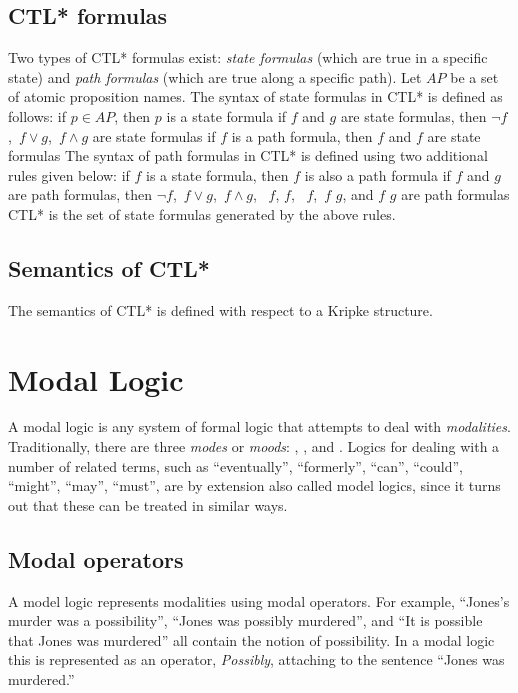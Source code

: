 \subsection{CTL* formulas}
Two types of CTL* formulas exist: {\em state formulas\/} (which are true in a
specific state) and {\em path formulas} (which are true along a specific
path). Let $AP$ be a set of atomic proposition names.
The syntax of state formulas in CTL* is defined as follows:
      \bit
      \w if $p \in AP$, then $p$ is a state formula
      \w if $f$ and $g$ are state formulas, then $\neg f$,\  $f \vee g$,\ $f
      \wedge g$ are state formulas
      \w if $f$ is a path formula, then  $f$ and  $f$ are state
      formulas 
      \eit
The syntax of path formulas in CTL* is defined using two additional rules
given below: 
      \bit
      \w if $f$ is a state formula, then $f$ is also a path formula
      \w if $f$ and $g$ are path formulas, then $\neg f$,\ $f \vee g$,\ 
      $f \wedge g$,\  $f$,  $f$,\  $f$,\ $f$  $g$,
      and $f$ \bb{R} $g$ are path formulas
      \eit
CTL* is the set of state formulas generated by the above rules.


\subsection{Semantics of CTL*}
The semantics of CTL* is defined with respect to a Kripke structure.


\section{Modal Logic}
\noindent{}A modal logic is any system of formal logic that attempts to deal
with {\em modalities}. Traditionally, there are three {\em modes\/} or 
{\em moods\/}: \bb{possibility}, \bb{probability}, and \bb{necessity}. 
Logics for dealing with a number of related terms, such as ``eventually'',
``formerly'', ``can'', ``could'', ``might'', ``may'', ``must'', are by
extension also called model logics, since it turns out that these can be
treated in similar ways. 

\subsection{Modal operators}
A model logic represents modalities using modal operators. 
For example, ``Jones's murder was a possibility'', ``Jones was possibly
murdered'', and ``It is possible that Jones was murdered'' all contain 
the notion of possibility. In a modal logic this is represented as an
operator, {\em Possibly\/}, attaching to the sentence ``Jones was murdered.''

